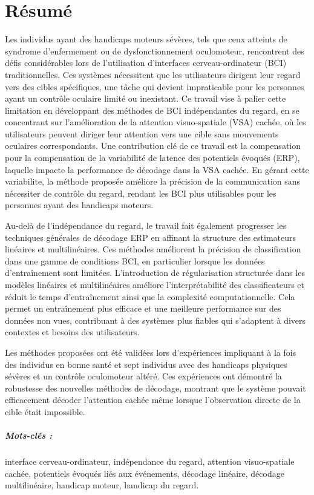 \chapter*{R\'esum\'e}
Les individus ayant des handicaps moteurs sévères, tels que ceux atteints de
syndrome d'enfermement ou de dysfonctionnement oculomoteur, rencontrent des défis considérables
lors de l'utilisation d'interfaces cerveau-ordinateur (BCI)  traditionnelles.
Ces systèmes nécessitent que les utilisateurs dirigent leur regard vers des
cibles spécifiques, une tâche qui devient impraticable pour les personnes ayant un contrôle oculaire limité ou inexistant.
Ce travail vise \`a palier cette limitation en développant des méthodes de BCI
indépendantes du regard, en se concentrant sur l'amélioration de la attention visuo-spatiale (VSA)
cachée,
où les utilisateurs peuvent diriger leur attention vers une cible sans mouvements
oculaires correspondants.
Une contribution clé de ce travail est la compensation pour la compensation de
la variabilité de latence des potentiels évoqués (ERP), laquelle impacte
la performance de décodage dans la
VSA cachée.
En gérant cette variabilite, la méthode proposée améliore la précision de la communication
sans nécessiter de contrôle du regard, rendant les BCI plus utilisables pour les personnes ayant des handicaps moteurs.

Au-delà de l'indépendance du regard, le travail fait également progresser les
techniques générales de décodage ERP en affinant la structure des estimateurs
linéaires et multilinéaires.
Ces méthodes améliorent la précision de classification dans une gamme de
conditions BCI, en particulier lorsque les données d'entraînement sont limitées.
L'introduction de régularisation structurée dans les modèles linéaires et
multilinéaires améliore l'interprétabilité des classificateurs et réduit le temps d'entraînement ainsi que la complexité computationnelle.
Cela permet un entraînement plus efficace et une meilleure performance sur des données non vues, contribuant à des systèmes plus fiables qui s'adaptent à divers contextes et besoins des utilisateurs.

Les méthodes proposées ont été validées lors d'expériences impliquant à la fois
des individus en bonne santé et sept individus avec des handicaps physiques sévères et un contrôle oculomoteur altéré.
Ces expériences ont démontré la robustesse des nouvelles méthodes de décodage, montrant que le système pouvait efficacement décoder l'attention cachée même lorsque l'observation directe de la cible  était impossible.

\paragraph{Mots-clés :} interface cerveau-ordinateur, indépendance du regard, attention visuo-spatiale cachée, potentiels évoqués liés aux événements, décodage linéaire, décodage multilinéaire, handicap moteur, handicap du regard.
